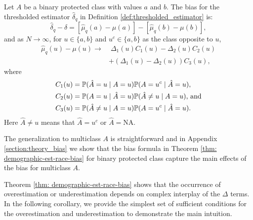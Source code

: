 \begin{theorem} \label{thm: demographic-est-race-bias}
Let $A$ be a binary protected class with values $a$ and $b$. 
The bias for the thresholded estimator $\hat{\delta}_q$ in Definition \ref{def:thresholded_estimator} is:
\[
\hat{\delta}_{q} - \delta = [\hat{\mu}_{q}(a) - \mu(a)] -  [\hat{\mu}_{q}(b) - \mu(b)],
\]
and as ${N \to \infty}$, for $u \in \{a, b\}$ and $u^c \in \{a, b\}$ as the class opposite to $u$, 
\begin{align*}
    \hat{\mu}_{q}(u) - \mu(u) \to &\;\Delta_1(u)C_1(u) - \Delta_2(u)C_2(u) \\
    &+ (\Delta_1(u) - \Delta_2(u))C_3(u),
\end{align*}
where
\begin{align*}
    C_1(u) & = \mathbb{P}(\hat{A} = u \mid A = u)\mathbb{P}(A = u^c \mid \hat{A} = u), \\
    C_2(u) & = \mathbb{P}(A = u \mid \hat{A} = u)\mathbb{P}(\hat{A} \ne u \mid A = u)\textrm{, and}\\
    C_3(u) & = \mathbb{P}(\hat{A} \ne u \mid A = u)\mathbb{P}(A = u^c \mid \hat{A} = u).
\end{align*}
Here $\hat{A} \ne u$ means that $\hat{A} = u^c$ or $\hat{A} = \text{NA}$.
\end{theorem}
%
The generalization to multiclass $A$ is straightforward and in Appendix \ref{section:theory_bias} we show that the bias formula in Theorem \ref{thm: demographic-est-race-bias} for binary protected class capture the main effects of the bias for multiclass $A$.

Theorem \ref{thm: demographic-est-race-bias} shows that the occurrence of overestimation or underestimation depends on complex interplay of the $\Delta$ terms. In the following corollary, we provide the simplest set of sufficient conditions for the overestimation and underestimation to demonstrate the main intuition.


